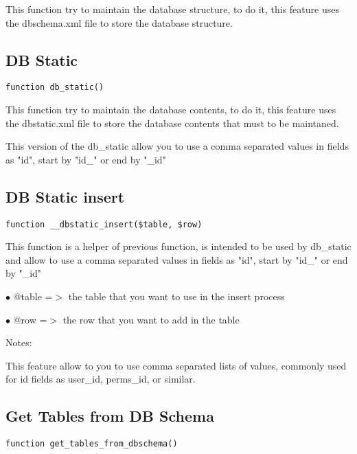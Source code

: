 \documentclass[a4paper]{book}
\begin{document}
This function try to maintain the database structure, to do it, this feature uses the dbschema.xml
file to store the database structure.

\hypertarget{toc88}{}
\subsection{DB Static}

\begin{lstlisting}
function db_static()
\end{lstlisting}

This function try to maintain the database contents, to do it, this feature
uses the dbstatic.xml file to store the database contents that must to be
maintaned.

This version of the db\_static allow you to use a comma separated values in
fields as "id", start by "id\_" or end by "\_id"

\hypertarget{toc89}{}
\subsection{DB Static insert}

\begin{lstlisting}
function __dbstatic_insert($table, $row)
\end{lstlisting}

This function is a helper of previous function, is intended to be used by db\_static and
allow to use a comma separated values in fields as "id", start by "id\_" or end by "\_id"

\begin{compactitem}
\item[\color{myblue}$\bullet$] @table =$>$ the table that you want to use in the insert process
\item[\color{myblue}$\bullet$] @row   =$>$ the row that you want to add in the table
\end{compactitem}

Notes:

This feature allow to you to use comma separated lists of values, commonly used for id
fields as user\_id, perms\_id, or similar.

\hypertarget{toc90}{}
\subsection{Get Tables from DB Schema}

\begin{lstlisting}
function get_tables_from_dbschema()
\end{lstlisting}
\end{document}
